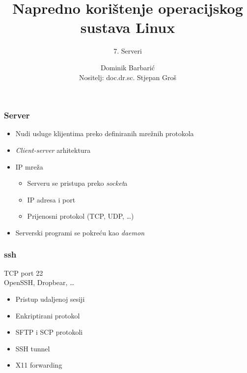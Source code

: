 \documentclass[t,table,usenames,dvipsnames]{beamer}
\date{\todayiso}
\title[NKOSL]{Napredno korištenje operacijskog sustava Linux}
\author[Dominik Barbarić]{Dominik Barbarić\\{\small Nositelj: doc.dr.sc. Stjepan Groš}}
\subtitle{7. Serveri}
\institute[FER]{Sveučilište u Zagrebu\\Fakultet elektrotehnike i računarstva}
\begin{document}
{
	\begin{frame}
		\maketitle
	\end{frame}
}

	
\begin{frame}
	\frametitle{Server}

	\begin{itemize}
		\item Nudi usluge klijentima preko definiranih mrežnih protokola
		\item \emph{Client-server} arhitektura
		
		\item IP mreža
		\begin{itemize}
			\item Serveru se pristupa preko \textit{socket}a
			\item[] IP adresa i port
			\item[] Prijenosni protokol (TCP, UDP, \ldots)
		\end{itemize}
		
		\item Serverski programi se pokreću kao \emph{daemon}

	\end{itemize}

\end{frame}




\begin{frame}
	\frametitle{ssh}
	
	TCP port 22\\
	OpenSSH, Dropbear, \ldots

	\begin{itemize}
		\item Pristup udaljenoj sesiji
		\item Enkriptirani protokol
		
		\item SFTP i SCP protokoli
		\item SSH tunnel
		\item[] X11 forwarding
	\end{itemize}
\end{frame}
\end{document}

